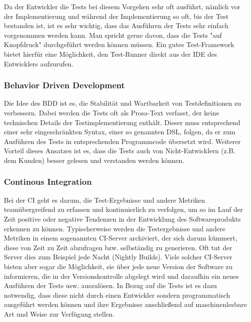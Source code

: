 Da der Entwickler die Tests bei diesem Vorgehen sehr oft ausführt, nämlich vor der Implementierung und während der Implementierung so oft, bis der Test bestanden ist, ist es sehr wichtig, dass das Ausführen der Tests sehr einfach vorgenommen werden kann. Man spricht gerne davon, dass die Tests "auf Knopfdruck" durchgeführt werden können müssen. Ein gutes Test-Framework bietet hierfür eine Möglichkeit, den Test-Runner direkt aus der \ac{IDE} des Entwicklers aufzurufen.

\subsubsection{Behavior Driven Development}

Die Idee des \ac{BDD} ist es, die Stabilität und Wartbarkeit von Testdefinitionen zu verbessern. Dabei werden die Tests oft als Prosa-Text verfasst, der keine technischen Details der Testimplementierung enthält. Dieser muss entsprechend einer sehr eingeschränkten Syntax, einer so genannten \ac{DSL}, folgen, da er zum Ausführen des Tests in entsprechenden Programmcode übersetzt wird. Weiterer Vorteil dieses Ansatzes ist es, dass die Tests auch von Nicht-Entwicklern (z.B. dem Kunden) besser gelesen und verstanden werden können.

\subsubsection{Continous Integration}

Bei der \ac{CI} geht es darum, die Test-Ergebnisse und andere Metriken teamübergreifend zu erfassen und kontinuierlich zu verfolgen, um so im Lauf der Zeit positive oder negative Tendenzen in der Entwicklung des Softwareprodukts erkennen zu können. Typischerweise werden die Testergebnisse und andere Metriken in einem sogenannten \ac{CI}-Server archiviert, der sich darum kümmert, diese von Zeit zu Zeit abzufragen bzw. selbständig zu generieren. Oft tut der Server dies zum Beispiel jede Nacht (Nightly Builds). Viele solcher CI-Server bieten aber sogar die Möglichkeit, sie über jede neue Version der Software zu informieren, die in der Versionskontrolle abgelegt wird und daraufhin ein neues Ausführen der Tests usw. auszulösen. In Bezug auf die Tests ist es dazu notwendig, dass diese nicht durch einen Entwickler sondern programmatisch ausgeführt werden können und ihre Ergebnisse anschließend auf maschinenlesbare Art und Weise zur Verfügung stellen.